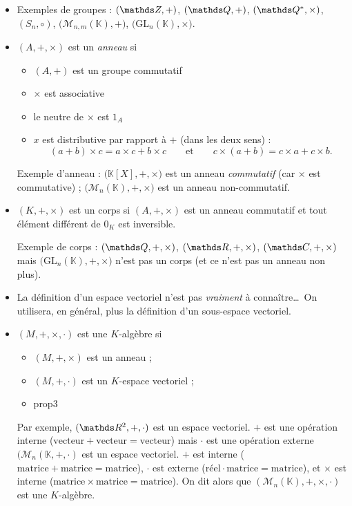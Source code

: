 \begin{rmkn}
	\begin{itemize}
		\item Exemples de groupes : $(\Z, +)$, $(\Q, +)$, $(\Q^*,\times)$, $(S_n,  \circ)$, $\big(\mathscr{M}_{n,m}(\mathds{K}), +\big)$, $\big(\mathrm{GL}_n(\mathds{K}),\times \big)$.
		\item $(A,+,\times)$\/ est un {\it anneau}\/ si
			\begin{itemize}
				\item $(A,+)$\/ est un groupe commutatif
				\item $\times $\/ est associative
				\item le neutre de $\times $\/ est $1_A$\/ 
				\item $x$\/ est distributive par rapport à $+$\/ (dans les deux sens) : \[
							(a+b)\times c = a \times c + b \times c
							\qquad\text{et}\qquad c \times (a+b) = c \times a + c \times b
					.\]
			\end{itemize}
			Exemple d'anneau : $\big(\mathds{K}[X], +, \times\big)$ est un anneau {\it commutatif}\/ (car $\times $\/ est commutative) ;  $\big(\mathscr{M}_{n}(\mathds{K}), + , \times \big)$\/ est un anneau non-commutatif.
		\item $(K, +, \times)$\/ est un corps si $(A, +, \times)$\/ est un anneau commutatif et tout élément différent de $0_K$\/ est inversible.

			Exemple de corps : $(\Q, +, \times)$, $(\R, +, \times)$, $(\C, +, \times)$ {\color{red}\sc mais} $\big(\mathrm{GL}_n(\mathds{K}), +, \times\big)$\/ n'est pas un corps (et ce n'est pas un anneau non plus).
		\item La définition d'un espace vectoriel n'est pas {\it vraiment}\/ à connaître\ldots\ On utilisera, en général, plus la définition d'un sous-espace vectoriel.
		\item $(M, +, \times, \cdot)$\/ est une $K$-algèbre si
			\begin{itemize}
				\item $(M, +, \times)$\/ est un anneau ;
				\item $(M, +, \cdot)$\/ est un $K$-espace vectoriel ;
				\item prop3
			\end{itemize}
			Par exemple, $(\R^2, +, \cdot)$\/ est un espace vectoriel. $+$\/ est une opération interne ($\mathrm{vecteur}+\mathrm{vecteur}=\mathrm{vecteur}$) mais $\cdot$\/ est une opération externe $(\mathscr{M}_n(\mathds{K}, +, \cdot)$\/ est un espace vectoriel. $+$\/ est interne ($\mathrm{matrice} + \mathrm{matrice} = \mathrm{matrice}$), $\cdot$\/ est externe ($\mathrm{réel} \cdot \mathrm{matrice} = \mathrm{matrice}$), et $\times $\/ est interne ($\mathrm{matrice} \times \mathrm{matrice} = \mathrm{matrice}$). On dit alors que $(\mathscr{M}_{n}(\mathds{K}), +, \times ,\cdot)$\/ est une $K$-algèbre.
	\end{itemize}
\end{rmkn}

